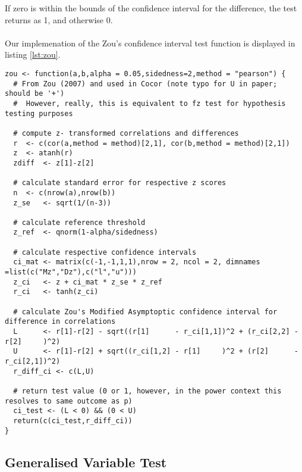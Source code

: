 If zero is within the bounds of the confidence interval for the difference, the test returns as 1, and otherwise 0.
\\
\\
Our implemenation of the Zou's confidence interval test function is displayed in listing \ref{lst:zou}.

\begin{lstlisting}[float=h,caption={Zou's confidence interval},label={lst:zou}]
zou <- function(a,b,alpha = 0.05,sidedness=2,method = "pearson") {
  # From Zou (2007) and used in Cocor (note typo for U in paper; should be '+')
  #  However, really, this is equivalent to fz test for hypothesis testing purposes
  
  # compute z- transformed correlations and differences
  r  <- c(cor(a,method = method)[2,1], cor(b,method = method)[2,1])
  z  <- atanh(r)
  zdiff  <- z[1]-z[2]
  
  # calculate standard error for respective z scores
  n  <- c(nrow(a),nrow(b))
  z_se   <- sqrt(1/(n-3))

  # calculate reference threshold
  z_ref  <- qnorm(1-alpha/sidedness)
  
  # calculate respective confidence intervals
  ci_mat <- matrix(c(-1,-1,1,1),nrow = 2, ncol = 2, dimnames =list(c("Mz","Dz"),c("l","u")))
  z_ci   <- z + ci_mat * z_se * z_ref
  r_ci   <- tanh(z_ci)
  
  # calculate Zou's Modified Asymptoptic confidence interval for difference in correlations
  L      <- r[1]-r[2] - sqrt((r[1]      - r_ci[1,1])^2 + (r_ci[2,2] - r[2]     )^2)
  U      <- r[1]-r[2] + sqrt((r_ci[1,2] - r[1]     )^2 + (r[2]      - r_ci[2,1])^2)
  r_diff_ci <- c(L,U)
  
  # return test value (0 or 1, however, in the power context this resolves to same outcome as p)
  ci_test <- (L < 0) && (0 < U)
  return(c(ci_test,r_diff_ci))
}
\end{lstlisting}



\subsection{Generalised Variable Test}

